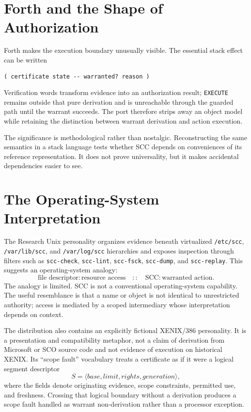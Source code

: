 \documentclass[11pt]{article}
\begin{document}
\section{Forth and the Shape of Authorization}
Forth makes the execution boundary unusually visible. The essential stack effect can be written
\begin{verbatim}
( certificate state -- warranted? reason )
\end{verbatim}
Verification words transform evidence into an authorization result; \texttt{EXECUTE} remains outside that pure derivation and is unreachable through the guarded path until the warrant succeeds. The port therefore strips away an object model while retaining the distinction between warrant derivation and action execution.

The significance is methodological rather than nostalgic. Reconstructing the same semantics in a stack language tests whether SCC depends on conveniences of its reference representation. It does not prove universality, but it makes accidental dependencies easier to see.

\section{The Operating-System Interpretation}
The Research Unix personality organizes evidence beneath virtualized \texttt{/etc/scc}, \texttt{/var/lib/scc}, and \texttt{/var/log/scc} hierarchies and exposes inspection through filters such as \texttt{scc-check}, \texttt{scc-lint}, \texttt{scc-fsck}, \texttt{scc-dump}, and \texttt{scc-replay}. This suggests an operating-system analogy:
\[
\text{file descriptor}:\text{resource access}\quad::\quad\text{SCC}:\text{warranted action}.
\]
The analogy is limited. SCC is not a conventional operating-system capability. The useful resemblance is that a name or object is not identical to unrestricted authority; access is mediated by a scoped intermediary whose interpretation depends on context.

The distribution also contains an explicitly fictional XENIX/386 personality. It is a presentation and compatibility metaphor, not a claim of derivation from Microsoft or SCO source code and not evidence of execution on historical XENIX. Its ``scope fault'' vocabulary treats a certificate as if it were a logical segment descriptor
\[
S=\langle base,limit,rights,generation\rangle,
\]
where the fields denote originating evidence, scope constraints, permitted use, and freshness. Crossing that logical boundary without a derivation produces a scope fault handled as warrant non-derivation rather than a processor exception.
\end{document}
